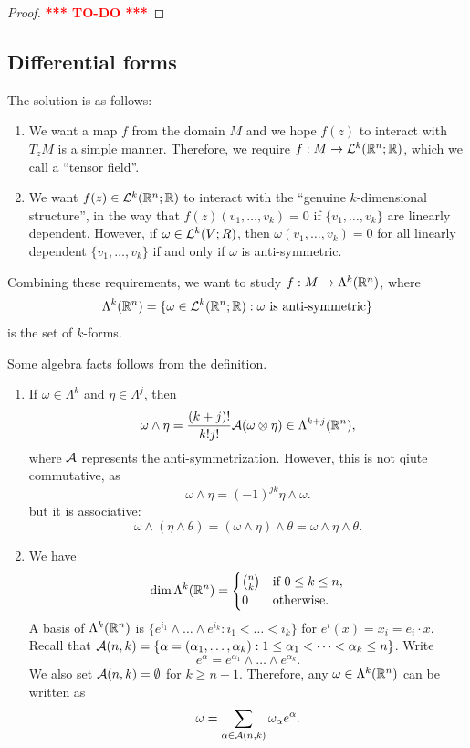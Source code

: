 \documentclass[a4paper]{article}
\newcommand{\TODO}{\textcolor{red}{\textbf{*** TO-DO ***}}}
\begin{document}
\begin{proof}
\TODO
\end{proof}


\subsection{Differential forms}

The solution is as follows:
\begin{enumerate}
\item We want a map $f$ from the domain $M$ and we hope
$f(z)$ to interact with $T_z M$ is a simple manner.
Therefore, we require $f : M \to \mathcal{L}^k(\mathbb{R}^n ; \mathbb{R})$, which we call
a ``tensor field''.

\item We want $f(z) \in \mathcal{L}^k(\mathbb{R}^n ; \mathbb{R})$ to interact
with the ``genuine $k$-dimensional structure'', in the way
that $f(z) (v_1, \dots, v_k) = 0$ if $\{v_1, \dots, v_k\}$
are linearly dependent. However, if
$\omega \in \mathcal{L}^k (V ; R)$, then $\omega (v_1, \dots, v_k) = 0$
for all linearly dependent $\{v_1, \dots, v_k\}$
if and only if $\omega$ is anti-symmetric.
\end{enumerate}
Combining these requirements, we want to
study $f : M \to \Lambda^k (\mathbb{R}^n)$, where
\[
\Lambda^k (\mathbb{R}^n)
= \{\omega \in \mathcal{L}^k(\mathbb{R}^n ; \mathbb{R}) : \omega \text{ is
anti-symmetric}\}
\]
is the set of $k$-forms.

Some algebra facts follows from the definition.
\begin{enumerate}
\item If $\omega \in \Lambda^k$ and $\eta \in \Lambda^j$,
then
\[
\omega \wedge \eta = \frac{(k+j)!}{k! j!} \mathcal{A} (\omega
\otimes \eta) \in \Lambda^{k+j}(\mathbb{R}^n),
\]
where $\mathcal{A}$ represents the anti-symmetrization.
However, this is not qiute commutative, as
\[
\omega \wedge \eta = (-1)^{jk} \eta \wedge \omega.
\]
but it is associative:
\[
\omega \wedge (\eta \wedge \theta)
= (\omega \wedge \eta) \wedge \theta
= \omega \wedge \eta \wedge \theta.
\]

\item We have
\[
\dim \Lambda^k(\mathbb{R}^n) = \begin{cases}
  \binom{n}{k} & \text{if $0 \leq k \leq n$},\\
  0 & \text{otherwise}.
\end{cases}
\]
A basis of $\Lambda^k (\mathbb{R}^n)$ is
$\{e^{i_1} \wedge \dots \wedge e^{i_k} : i_1 < \dots < i_k\}$
for $e^i (x) = x_i = e_i \cdot x$.
Recall that $\mathcal{A}(n, k) = \{\alpha = (\alpha_1, \dots,
\alpha_k) : 1 \leq \alpha_1 < \dots < \alpha_k \leq n\}$.
Write
\[
e^{\alpha} = e^{\alpha_1} \wedge \dots \wedge
e^{\alpha_k}.
\]
We also set $\mathcal{A}(n, k) = \emptyset$
for $k \geq n + 1$.
Therefore, any $\omega \in \Lambda^k(\mathbb{R}^n)$
can be written as
\[
\omega = \sum_{\alpha \in \mathcal{A}(n, k)}
\omega_\alpha e^{\alpha}.
\]
\end{enumerate}
\end{document}
